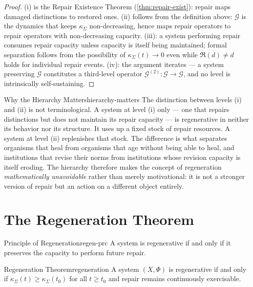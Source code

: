 \documentclass[12pt,twoside,openright]{book}
\newcommand{\repair}{\mathfrak{R}}
\begin{document}
\begin{proof}
  (i) is the Repair Existence Theorem (\cref{thm:repair-exist}):
  repair maps damaged distinctions to restored ones.
  (ii) follows from the definition above: $\mathcal{G}$ is
  the dynamics that keeps $\kappa_\Sigma$ non-decreasing,
  hence maps repair operators to repair operators with
  non-decreasing capacity. (iii): a system performing
  repair consumes repair capacity unless capacity is itself
  being maintained; formal separation follows from the
  possibility of $\kappa_\Sigma(t) \to 0$ even while
  $\repair(d) \ne d$ holds for individual repair events.
  (iv): the argument iterates --- a system preserving
  $\mathcal{G}$ constitutes a third-level operator
  $\mathcal{G}^{(2)} : \mathcal{G} \to \mathcal{G}$, and
  no level is intrinsically self-sustaining.
\end{proof}

\begin{remark}{Why the Hierarchy Matters}{hierarchy-matters}
  The distinction between levels (i) and (ii) is not
  terminological. A system at level (i) only --- one that
  repairs distinctions but does not maintain its repair
  capacity --- is regenerative in neither its behavior nor
  its structure. It uses up a fixed stock of repair
  resources. A system at level (ii) replenishes that stock.
  The difference is what separates organisms that heal from
  organisms that age without being able to heal, and
  institutions that revise their norms from institutions
  whose revision capacity is itself eroding. The hierarchy
  therefore makes the concept of regeneration
  \emph{mathematically unavoidable} rather than merely
  motivational: it is not a stronger version of repair but
  an action on a different object entirely.
\end{remark}

\section{The Regeneration Theorem}
\label{sec:ch11-theorem}

\begin{principle}{Principle of Regeneration}{regen-prc}
  A system is regenerative if and only if it preserves the
  capacity to perform future repair.
\end{principle}

\begin{theorem}{Regeneration Theorem}{regeneration}
  A system $(X,\Phi)$ is regenerative if and only if
  $\kappa_\Sigma(t)\ge\kappa_\Sigma(t_0)$ for all $t\ge t_0$
  and repair remains continuously
  exercisable.
\end{theorem}
\end{document}
